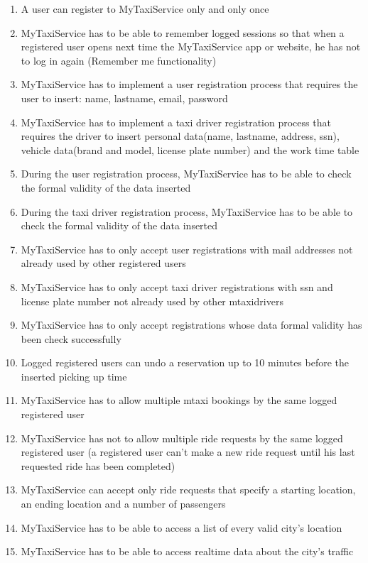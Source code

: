 \documentclass[11pt,titlepage]{article} %
\begin{document}
\begin{enumerate}
	      \item A user can register to MyTaxiService only and only once
	      \item MyTaxiService has to be able to remember logged sessions so that when a registered user
	      opens next time the MyTaxiService app or website, he has not to log in again (Remember me functionality)
	      \item MyTaxiService has to implement a user registration process that requires the user to insert: name, lastname,
	      email, password
	      \item MyTaxiService has to implement a taxi driver registration process that requires the driver to insert personal data(name, lastname, address, ssn), vehicle data(brand and model, license plate number) and
	      the work time table
	      \item During the user registration process, MyTaxiService has to be able to check the formal validity of the
	      data inserted
	      \item During the taxi driver registration process, MyTaxiService has to be able to check the formal validity of the
	      data inserted
	      \item MyTaxiService has to only accept user registrations with mail addresses not already used by other
	      registered users
	      \item MyTaxiService has to only accept taxi driver registrations with ssn and license plate number not already used by other mtaxidrivers
	      \item MyTaxiService has to only accept registrations whose data formal validity has been
	      check successfully
	      \item Logged registered users can undo a reservation up to 10 minutes before the inserted
	      picking up time
	      \item MyTaxiService has to allow multiple mtaxi bookings by the same logged registered user
	      \item MyTaxiService has not to allow multiple ride requests by the same logged registered user
	      (a registered user can't make a new ride request until his last requested ride has been completed)
	      \item MyTaxiService can accept only ride requests that specify a starting location, an ending location
	      and a number of passengers
	      \item MyTaxiService has to be able to access a list of every valid city's location
	      \item MyTaxiService has to be able to access realtime data about the city's traffic

\end{enumerate}
\end{document}
